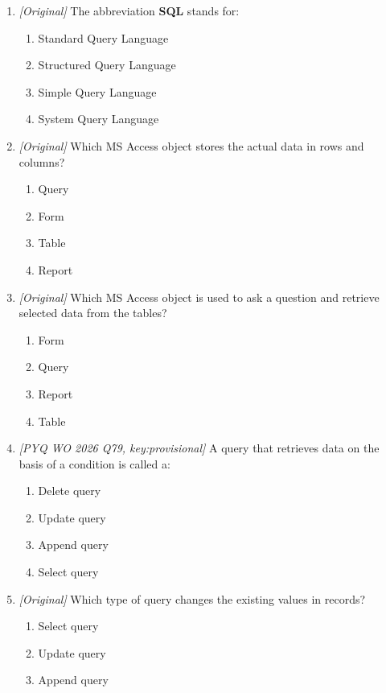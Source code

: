 \begin{enumerate}[label=\textbf{Q\arabic*.}, leftmargin=*]
\item \textit{[Original]} The abbreviation \textbf{SQL} stands for:
  \begin{enumerate}[label=\Alph*.]
    \item Standard Query Language
    \item Structured Query Language
    \item Simple Query Language
    \item System Query Language
  \end{enumerate}
\item \textit{[Original]} Which MS Access object stores the actual data in
  rows and columns?
  \begin{enumerate}[label=\Alph*.]
    \item Query
    \item Form
    \item Table
    \item Report
  \end{enumerate}
\item \textit{[Original]} Which MS Access object is used to ask a question
  and retrieve selected data from the tables?
  \begin{enumerate}[label=\Alph*.]
    \item Form
    \item Query
    \item Report
    \item Table
  \end{enumerate}
\item \textit{[PYQ WO 2026 Q79, key:provisional]} A query that retrieves
  data on the basis of a condition is called a:
  \begin{enumerate}[label=\Alph*.]
    \item Delete query
    \item Update query
    \item Append query
    \item Select query
  \end{enumerate}
\item \textit{[Original]} Which type of query changes the existing values in
  records?
  \begin{enumerate}[label=\Alph*.]
    \item Select query
    \item Update query
    \item Append query

\end{enumerate}
\end{enumerate}
